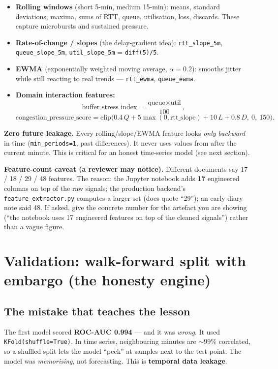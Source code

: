 \documentclass[11pt,a4paper]{article}
\newcommand{\note}[1]{%
  \par\vspace{3pt}\noindent
  \colorbox{soft}{\parbox{\dimexpr\linewidth-2\fboxsep}{\small #1}}%
  \par\vspace{3pt}}
\newcommand{\warn}[1]{%
  \par\vspace{3pt}\noindent
  \colorbox{warnbg}{\parbox{\dimexpr\linewidth-2\fboxsep}{\small #1}}%
  \par\vspace{3pt}}
\begin{document}
\begin{itemize}
  \item \textbf{Rolling windows} (short 5-min, medium 15-min): means, standard deviations, maxima, sums of
  RTT, queue, utilisation, loss, discards. These capture microbursts and sustained pressure.
  \item \textbf{Rate-of-change / slopes} (the delay-gradient idea):
  \texttt{rtt\_slope\_5m}, \texttt{queue\_slope\_5m}, \texttt{util\_slope\_5m} = \texttt{diff(5)/5}.
  \item \textbf{EWMA} (exponentially weighted moving average, $\alpha=0.2$): smooths jitter while still
  reacting to real trends --- \texttt{rtt\_ewma}, \texttt{queue\_ewma}.
  \item \textbf{Domain interaction features:}
  \[ \text{buffer\_stress\_index}=\frac{\text{queue}\times\text{util}}{100}, \]
  \[ \text{congestion\_pressure\_score}=\mathrm{clip}\big(0.4\,Q+5\max(0,\text{rtt\_slope})+10\,L+0.8\,D,\ 0,\ 150\big). \]
\end{itemize}

\warn{\textbf{Zero future leakage.} Every rolling/slope/EWMA feature looks \emph{only backward} in time
(\texttt{min\_periods=1}, past differences). It never uses values from after the current minute. This is
critical for an honest time-series model (see next section).}

\note{\textbf{Feature-count caveat (a reviewer may notice).} Different documents say 17 / 18 / 29 / 48
features. The reason: the Jupyter notebook adds \textbf{17} engineered columns on top of the raw signals; the
production backend's \texttt{feature\_extractor.py} computes a larger set (docs quote ``29''); an early diary
note said 48. If asked, give the concrete number for the artefact you are showing (``the notebook uses 17
engineered features on top of the cleaned signals'') rather than a vague figure.}

\section{Validation: walk-forward split with embargo (the honesty engine)}
\subsection{The mistake that teaches the lesson}
The first model scored \textbf{ROC-AUC 0.994} --- and it was \emph{wrong}. It used
\texttt{KFold(shuffle=True)}. In time series, neighbouring minutes are $\sim$99\% correlated, so a shuffled
split lets the model ``peek'' at samples next to the test point. The model was \emph{memorising}, not
forecasting. This is \textbf{temporal data leakage}.
\end{document}
